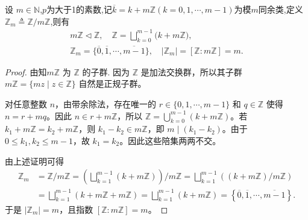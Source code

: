 \documentclass[../../main.tex]{subfiles}%
\begin{document}
\begin{proposition}\label{proposition:整数加群的商群}
设 \( m\in \mathbb{N}\),$p$为大于1的素数,记$\overline{k}= k + m\mathbb{Z}(k=0,1,\cdots,m-1)$为模$m$同余类,定义$\mathbb{Z}_m \triangleq \mathbb{Z} /m\mathbb{Z}$,则有
\begin{gather*}
m\mathbb{Z} \lhd \mathbb{Z} ,\quad \mathbb{Z} =\bigsqcup_{k=0}^{m-1}{(k}+m\mathbb{Z} ),
\\
\mathbb{Z} _m =\{\overline{0},\overline{1},\cdots ,\overline{m-1}\},\quad |\mathbb{Z} _m|=[\mathbb{Z} :m\mathbb{Z} ]=m.
\end{gather*}
\end{proposition}
\begin{proof}

由知\(m\mathbb{Z} \) 为 \( \mathbb{Z} \) 的子群.
因为 \(\mathbb{Z}\) 是加法交换群，所以其子群 \(m\mathbb{Z} = \{ mz \mid z \in \mathbb{Z} \}\) 自然是正规子群。

对任意整数 \(n\)，由带余除法，存在唯一的 \(r \in \{0,1,\cdots,m-1\}\) 和 \(q \in \mathbb{Z}\) 使得 \(n = r + mq\)。因此 \(n \in r + m\mathbb{Z}\)，所以 \(\mathbb{Z} = \bigcup_{k=0}^{m-1} (k + m\mathbb{Z})\)。若 \(k_1 + m\mathbb{Z} = k_2 + m\mathbb{Z}\)，则 \(k_1 - k_2 \in m\mathbb{Z}\)，即 \(m \mid (k_1 - k_2)\)。由于 \(0 \leq k_1,k_2 \leq m-1\)，故 \(k_1 = k_2\)。因此这些陪集两两不交。

由上述证明可得
\begin{align*}
\mathbb{Z} _m &= \mathbb{Z} /m\mathbb{Z} =\left( \bigsqcup_{k=1}^{m-1}{\left( k+m\mathbb{Z} \right)} \right) /m\mathbb{Z} =\bigsqcup_{k=1}^{m-1}{\left( \left( k+m\mathbb{Z} \right) /m\mathbb{Z} \right)}
\\
&=\bigsqcup_{k=1}^{m-1}{\left( k+m\mathbb{Z} +m\mathbb{Z} \right)}=\bigsqcup_{k=1}^{m-1}{\left( k+m\mathbb{Z} \right)}=\left\{ \overline{0},\overline{1},\cdots ,\overline{m-1} \right\} .
\end{align*}
于是 \(|\mathbb{Z}_m| = m\)，且指数 \([\mathbb{Z}:m\mathbb{Z}] = m\)。

\end{proof}
\end{document}
